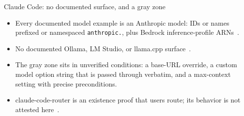 \documentclass[aspectratio=169,11pt]{beamer}
\begin{document}
\begin{frame}{Claude Code: no documented surface, and a gray zone}
  \begin{itemize}
    \item Every documented model example is an Anthropic model: IDs or
    names prefixed or namespaced \texttt{anthropic.}, plus Bedrock
    inference-profile ARNs~\citep{claudeCodeModelDocs,claudeCodeBedrockDocs}.
    \item No documented Ollama, LM Studio, or llama.cpp
    surface~\citep{ollamaCompatDocs,lmstudioApiDocs,llamaCppServerDocs}.
    \item The gray zone sits in unverified conditions: a base-URL
    override, a custom model option string that is passed through
    verbatim, and a max-context setting with precise preconditions.
    \item \textsf{claude-code-router} is an existence proof that users
    route; its behavior is not attested here~\citep{claudeCodeRouterContext}.
  \end{itemize}
\end{frame}
\end{document}
